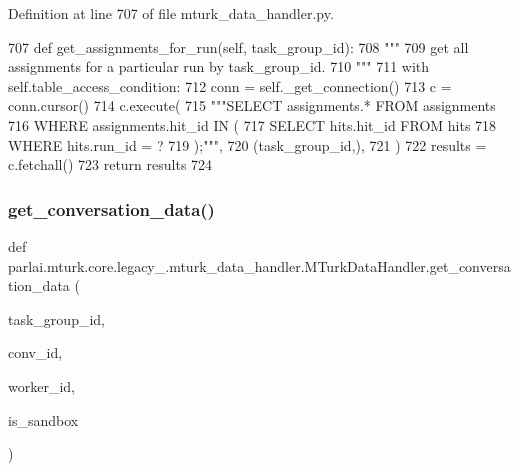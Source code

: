 Definition at line 707 of file mturk\+\_\+data\+\_\+handler.\+py.


\begin{DoxyCode}
707     \textcolor{keyword}{def }get\_assignments\_for\_run(self, task\_group\_id):
708         \textcolor{stringliteral}{"""}
709 \textcolor{stringliteral}{        get all assignments for a particular run by task\_group\_id.}
710 \textcolor{stringliteral}{        """}
711         with self.table\_access\_condition:
712             conn = self.\_get\_connection()
713             c = conn.cursor()
714             c.execute(
715                 \textcolor{stringliteral}{"""SELECT assignments.* FROM assignments}
716 \textcolor{stringliteral}{                         WHERE assignments.hit\_id IN (}
717 \textcolor{stringliteral}{                           SELECT hits.hit\_id FROM hits}
718 \textcolor{stringliteral}{                           WHERE hits.run\_id = ?}
719 \textcolor{stringliteral}{                         );"""},
720                 (task\_group\_id,),
721             )
722             results = c.fetchall()
723             \textcolor{keywordflow}{return} results
724 
\end{DoxyCode}
\mbox{\label{classparlai_1_1mturk_1_1core_1_1legacy__2018_1_1mturk__data__handler_1_1MTurkDataHandler_a0726a2a5d8840cde079523917ee0706d}} 
\subsubsection{\texorpdfstring{get\+\_\+conversation\+\_\+data()}{get\_conversation\_data()}}
{\footnotesize\ttfamily def parlai.\+mturk.\+core.\+legacy\+\_.\+mturk\+\_\+data\+\_\+handler.\+M\+Turk\+Data\+Handler.\+get\+\_\+conversation\+\_\+data (\begin{DoxyParamCaption}\item[{}]{task\+\_\+group\+\_\+id,  }\item[{}]{conv\+\_\+id,  }\item[{}]{worker\+\_\+id,  }\item[{}]{is\+\_\+sandbox }\end{DoxyParamCaption})\hspace{0.3cm}{\ttfamily [static]}}

